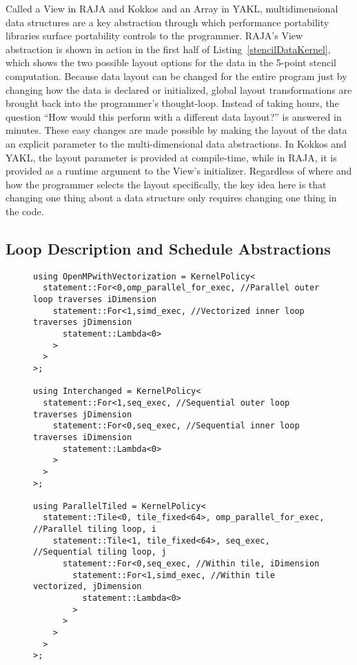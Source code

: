 Called a View in RAJA and Kokkos and an Array in YAKL, multidimensional data structures are a key abstraction through which performance portability libraries surface portability controls to the programmer.
RAJA's View abstraction is shown in action in the first half of Listing~\ref{stencilDataKernel}, which shows the two possible layout options for the data in the 5-point stencil computation.
Because data layout can be changed for the entire program just by changing how the data is declared or initialized, global layout transformations are brought back into the programmer's thought-loop.
Instead of taking hours, the question ``How would this perform with a different data layout?'' is answered in minutes.
These easy changes are made possible by making the layout of the data an explicit parameter to the multi-dimensional data abstractions.
In Kokkos and YAKL, the layout parameter is provided at compile-time, while in RAJA, it is provided as a runtime argument to the View's initializer.
Regardless of where and how the programmer selects the layout specifically, the key idea here is that changing one thing about a data structure only requires changing one thing in the code.

\subsection{Loop Description and Schedule Abstractions}

\begin{figure}
\begin{lstlisting}[caption={Kernel policies for different loop schedules.}, label={stencilSchedule}]
using OpenMPwithVectorization = KernelPolicy<
  statement::For<0,omp_parallel_for_exec, //Parallel outer loop traverses iDimension
    statement::For<1,simd_exec, //Vectorized inner loop traverses jDimension
      statement::Lambda<0>
    >
  >
>;

using Interchanged = KernelPolicy<
  statement::For<1,seq_exec, //Sequential outer loop traverses jDimension
    statement::For<0,seq_exec, //Sequential inner loop traverses iDimension
      statement::Lambda<0>
    >
  >
>;

using ParallelTiled = KernelPolicy<
  statement::Tile<0, tile_fixed<64>, omp_parallel_for_exec, //Parallel tiling loop, i
    statement::Tile<1, tile_fixed<64>, seq_exec, //Sequential tiling loop, j
      statement::For<0,seq_exec, //Within tile, iDimension
        statement::For<1,simd_exec, //Within tile vectorized, jDimension
          statement::Lambda<0>
        >
      >
    >
  >
>;
\end{lstlisting}
\end{figure}

